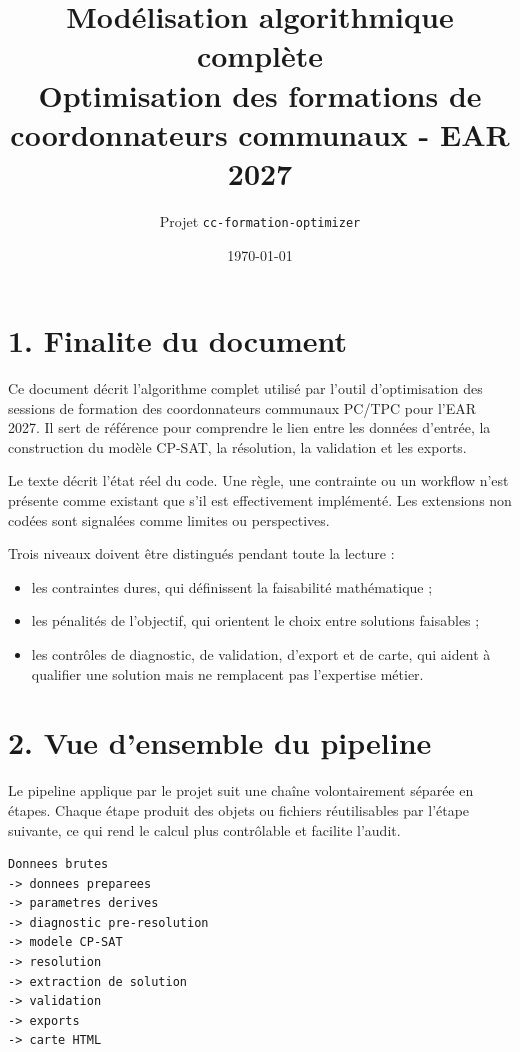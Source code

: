 \documentclass[11pt,a4paper]{article}
\title{\textbf{Modélisation algorithmique complète}\\
\large Optimisation des formations de coordonnateurs communaux - EAR 2027}
\author{Projet \texttt{cc-formation-optimizer}}
\date{\today}
\begin{document}
\maketitle
\tableofcontents
\newpage

\section{1. Finalite du document}

Ce document décrit l'algorithme complet utilisé par l'outil d'optimisation des sessions de formation des coordonnateurs communaux PC/TPC pour l'EAR 2027. Il sert de référence pour comprendre le lien entre les données d'entrée, la construction du modèle CP-SAT, la résolution, la validation et les exports.

Le texte décrit l'état réel du code. Une règle, une contrainte ou un workflow n'est présente comme existant que s'il est effectivement implémenté. Les extensions non codées sont signalées comme limites ou perspectives.

Trois niveaux doivent être distingués pendant toute la lecture :

\begin{itemize}
\item les contraintes dures, qui définissent la faisabilité mathématique ;
\item les pénalités de l'objectif, qui orientent le choix entre solutions faisables ;
\item les contrôles de diagnostic, de validation, d'export et de carte, qui aident à
qualifier une solution mais ne remplacent pas l'expertise métier.

\end{itemize}

\section{2. Vue d'ensemble du pipeline}

Le pipeline applique par le projet suit une chaîne volontairement séparée en étapes. Chaque étape produit des objets ou fichiers réutilisables par l'étape suivante, ce qui rend le calcul plus contrôlable et facilite l'audit.

\begin{verbatim}
Donnees brutes
-> donnees preparees
-> parametres derives
-> diagnostic pre-resolution
-> modele CP-SAT
-> resolution
-> extraction de solution
-> validation
-> exports
-> carte HTML
\end{verbatim}
\end{document}
